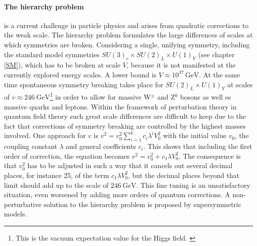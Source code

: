 \paragraph{The hierarchy problem} is a current challenge in particle physics and arises from quadratic corrections to the weak scale. \cite{hierarchy} The hierarchy problem formulates the large differences of scales at which symmetries are broken. Considering a single, unifying symmetry, including the standard model symmetries $SU(3)_c\times SU(2)_L\times U(1)_Y$ (see chapter \ref{SM}), which has to be broken at scale $V$, because it is not manifested at the currently explored energy scales. A lower bound is $V\approx 10^{37}\,\text{GeV}$. At the same time spontaneous symmetry breaking takes place for $SU(2)_L\times U(1)_Y$ at scales of $v\approx\SI{246}{\giga\electronvolt}$\footnote{This is the vacuum expectation value for the Higgs field. \cite{VEV}} in order to allow for massive W$^\pm$ and Z$^0$ bosons as well es massive quarks and leptons. Within the framework of perturbation theory in quantum field theory such great scale differences are difficult to keep due to the fact that corrections of symmetry breaking are controlled by the highest masses involved. One approach for $v$ is $v^2=v_0^2\sum_{i=1}^kc_i\lambda^i V_0^2$ with the initial value $v_0$, the coupling constant $\lambda$ and general coefficients $c_i$. This shows that including the first order of correction, the equation becomes $v^2=v_0^2+c_1\lambda V_0^2$. The consequence is that $v_0^2$ has to be adjusted in such a way that it cancels out several decimal places, for instance 25, of the term $c_1\lambda V_0^2$, but the decimal places beyond that limit should add up to the scale of $\SI{246}{\giga\electronvolt}$. This fine tuning is an unsatisfactory situation, even worsened by adding more orders of quantum corrections. \cite{Nair} A non-perturbative solution to the hierarchy problem is proposed by supersymmetric models. \cite{nonperturbative} 
